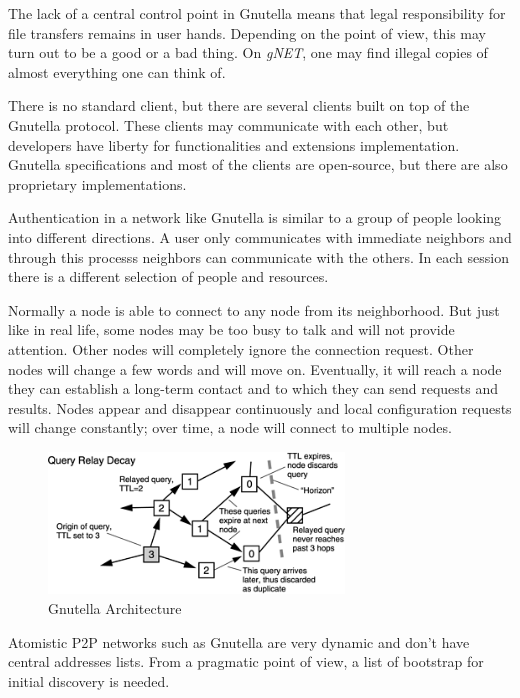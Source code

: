 The lack of a central control point in Gnutella means that legal
responsibility for file transfers remains in user hands. Depending on the
point of view, this may turn out to be a good or a bad thing. On
\textit{gNET}, one may find illegal copies of almost everything one can think
of.

There is no standard client, but there are several clients built on top of the
Gnutella protocol. These clients may communicate with each other, but
developers have liberty for functionalities and extensions implementation.
Gnutella specifications and most of the clients are open-source, but there are
also proprietary implementations.

Authentication in a network like Gnutella is similar to a group of people
looking into different directions. A user only communicates with immediate
neighbors and through this processs neighbors can communicate with the others.
In each session there is a different selection of people and resources.

Normally a node is able to connect to any node from its neighborhood. But just
like in real life, some nodes may be too busy to talk and will not provide
attention. Other nodes will completely ignore the connection request. Other
nodes will change a few words and will move on. Eventually, it will reach a
node they can establish a long-term contact and to which they can send
requests and results. Nodes appear and disappear continuously and local
configuration requests will change constantly; over time, a node will connect
to multiple nodes.

\begin{figure}
  \centering
  \includegraphics[width=0.7\textwidth]{src/img/p2p-systems/gnutella}
  \caption{Gnutella Architecture}
  \label{fig:p2p-systems:gnutella}
\end{figure}

Atomistic P2P networks such as Gnutella are very dynamic and don't have central
addresses lists. From a pragmatic point of view, a list of bootstrap for initial
discovery is needed.


